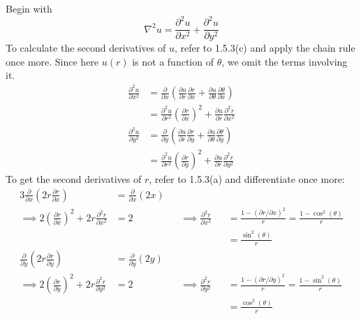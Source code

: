 \documentclass[a4paper]{article}
\begin{document}
Begin with
\[
	\nabla^{2}u = \frac{\partial^2 u}{\partial x^2} + \frac{\partial^2 u}{\partial y^2}
\]
To calculate the second derivatives of \( u \), refer to 1.5.3(c) and apply the chain rule once more. Since here \( u \!\left( r \right) \) is not a function of \( \theta \), we omit the terms involving it.
\begin{align*}
	\frac{\partial^2 u}{\partial x^2} & = \frac{\partial }{\partial x}\!\left( \frac{\partial u}{\partial r}\frac{\partial r}{\partial x} + \frac{\partial u}{\partial \theta}\frac{\partial \theta}{\partial x} \right) \\
	 & = \frac{\partial^2 u}{\partial r^2}\!\left( \frac{\partial r}{\partial x} \right)^{2} + \frac{\partial u}{\partial r}\frac{\partial^2 r}{\partial x^2} \\
	\frac{\partial^2 u}{\partial y^2} & = \frac{\partial }{\partial y}\!\left( \frac{\partial u}{\partial r}\frac{\partial r}{\partial y} + \frac{\partial u}{\partial \theta}\frac{\partial \theta}{\partial y} \right) \\
	 & = \frac{\partial^2 u}{\partial r^2}\!\left( \frac{\partial r}{\partial y} \right)^{2} + \frac{\partial u}{\partial r}\frac{\partial^2 r}{\partial y^2}
\end{align*}
To get the second derivatives of \( r \), refer to 1.5.3(a) and differentiate once more:
\begin{alignat*}{3}
	\frac{\partial }{\partial x}\!\left( 2r \frac{\partial r}{\partial x} \right) & = \frac{\partial }{\partial x}\!\left( 2x \right) && && \\
	\implies 2 \!\left( \frac{\partial r}{\partial x} \right)^{2} + 2r \frac{\partial^2 r}{\partial x^2} & = 2 && \implies \frac{\partial^2 r}{\partial x^2} && = \frac{1 - \!\left( \partial r / \partial x \right)^{2}}{r} = \frac{1 - \cos^{2}\!\left(\theta\right)}{r} \\
													     & && && = \boxed{\frac{\sin^{2}\!\left(\theta\right)}{r}} \\ 
	\frac{\partial }{\partial y}\!\left( 2r \frac{\partial r}{\partial y} \right) & = \frac{\partial }{\partial y}\!\left( 2y \right) && && \\
	\implies 2 \!\left( \frac{\partial r}{\partial y} \right)^{2} + 2r \frac{\partial^2 r}{\partial y^2} & = 2 && \implies \frac{\partial^2 r}{\partial y^2} && = \frac{1 - \!\left( \partial r / \partial y \right)^{2}}{r} = \frac{1 - \sin^{2}\!\left(\theta\right)}{r} \\ 
													     & && && = \boxed{\frac{\cos^{2}\!\left(\theta\right)}{r}}
\end{alignat*}
\end{document}
